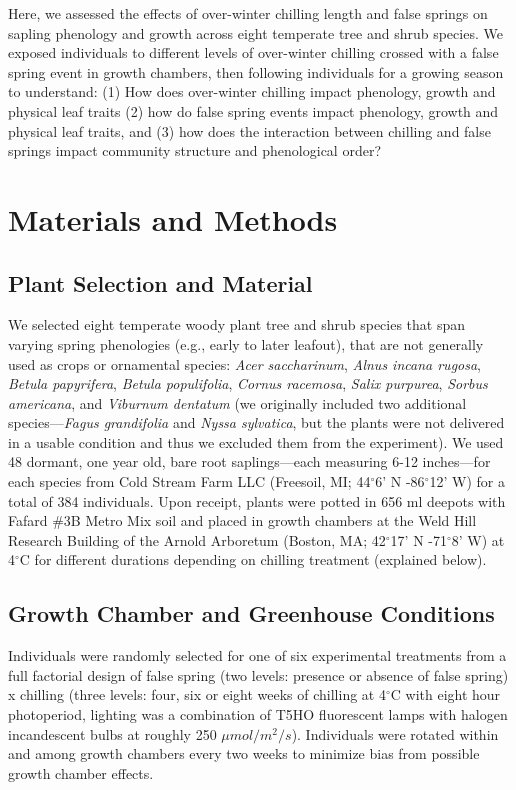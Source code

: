 \documentclass{article}\usepackage[]{graphicx}\usepackage[]{color}
\begin{document}
Here, we assessed the effects of over-winter chilling length and false springs on sapling phenology and growth across eight temperate tree and shrub species. We exposed individuals to different levels of over-winter chilling crossed with a false spring event in growth chambers, then following individuals for a growing season to understand: (1) How does over-winter chilling impact phenology, growth and physical leaf traits (2) how do false spring events impact phenology, growth and physical leaf traits, and (3) how does the interaction between chilling and false springs impact community structure and phenological order?

\section*{Materials and Methods} 
\subsection*{Plant Selection and Material}
We selected eight temperate woody plant tree and shrub species that span varying spring phenologies (e.g., early to later leafout), that are not generally used as crops or ornamental species: \textit{Acer saccharinum}, \textit{Alnus incana rugosa}, \textit{Betula papyrifera}, \textit{Betula populifolia}, \textit{Cornus racemosa}, \textit{Salix purpurea}, \textit{Sorbus americana}, and \textit{Viburnum dentatum} (we originally included two additional species---\textit{Fagus grandifolia} and \textit{Nyssa sylvatica}, but the plants were not delivered in a usable condition and thus we excluded them from the experiment). We used 48 dormant, one year old, bare root saplings---each measuring 6-12 inches---for each species from Cold Stream Farm LLC (Freesoil, MI; 44$^{\circ}$6' N -86$^{\circ}$12' W) for a total of 384 individuals. Upon receipt, plants were potted in 656 ml deepots with Fafard \#3B Metro Mix soil and placed in growth chambers at the Weld Hill Research Building of the Arnold Arboretum (Boston, MA; 42$^{\circ}$17' N -71$^{\circ}$8' W) at 4$^{\circ}$C for different durations depending on chilling treatment (explained below).   

\subsection*{Growth Chamber and Greenhouse Conditions}
Individuals were randomly selected for one of six experimental treatments from a full factorial design of false spring (two levels: presence or absence of false spring) x chilling (three levels: four, six or eight weeks of chilling at 4$^{\circ}$C with eight hour photoperiod, lighting was a combination of T5HO fluorescent lamps with halogen incandescent bulbs at roughly 250 $\mu mol/m^{2}/s$). Individuals were rotated within and among growth chambers every two weeks to minimize bias from possible growth chamber effects.
\end{document}
